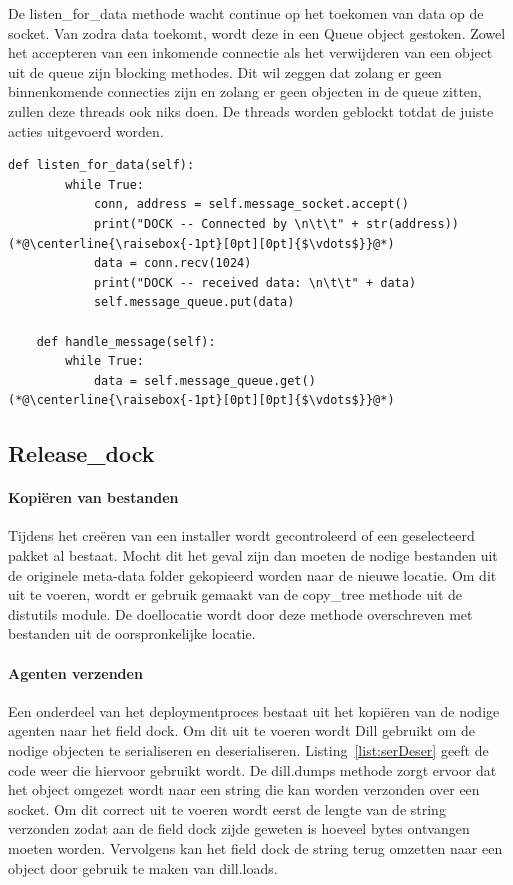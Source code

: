 De listen\_for\_data methode wacht continue op het toekomen van data op de socket.
Van zodra data toekomt, wordt deze in een Queue object gestoken.
Zowel het accepteren van een inkomende connectie als het verwijderen van een object uit de queue zijn blocking methodes.
Dit wil zeggen dat zolang er geen binnenkomende connecties zijn en zolang er geen objecten in de queue zitten, zullen deze threads ook niks doen.
De threads worden geblockt totdat de juiste acties uitgevoerd worden.

\begin{minipage}{\linewidth}
\begin{center}
\begin{lstlisting}[captionpos=b,caption={Ontvangen en afhandelen van data},label={list:receiveData}]
    def listen_for_data(self):
        while True:
            conn, address = self.message_socket.accept()
            print("DOCK -- Connected by \n\t\t" + str(address))
(*@\centerline{\raisebox{-1pt}[0pt][0pt]{$\vdots$}}@*)
            data = conn.recv(1024)
            print("DOCK -- received data: \n\t\t" + data)
            self.message_queue.put(data)
            
    def handle_message(self):
        while True:
            data = self.message_queue.get()
(*@\centerline{\raisebox{-1pt}[0pt][0pt]{$\vdots$}}@*)
\end{lstlisting}
\end{center}
\end{minipage}

\subsection{Release\_dock}
\paragraph{Kopiëren van bestanden} %
Tijdens het creëren van een installer wordt gecontroleerd of een geselecteerd pakket al bestaat.
Mocht dit het geval zijn dan moeten de nodige bestanden uit de originele meta-data folder gekopieerd worden naar de nieuwe locatie.
Om dit uit te voeren, wordt er gebruik gemaakt van de copy\_tree methode uit de distutils module.
De doellocatie wordt door deze methode overschreven met bestanden uit de oorspronkelijke locatie.

\paragraph{Agenten verzenden}
Een onderdeel van het deploymentproces bestaat uit het kopiëren van de nodige agenten naar het field dock.
Om dit uit te voeren wordt Dill \citep{dill} gebruikt om de nodige objecten te serialiseren en deserialiseren.
Listing~\ref{list:serDeser} geeft de code weer die hiervoor gebruikt wordt.
De dill.dumps methode zorgt ervoor dat het object omgezet wordt naar een string die kan worden verzonden over een socket.
Om dit correct uit te voeren wordt eerst de lengte van de string verzonden zodat aan de field dock zijde geweten is hoeveel bytes ontvangen moeten worden. 
Vervolgens kan het field dock de string terug omzetten naar een object door gebruik te maken van dill.loads.

